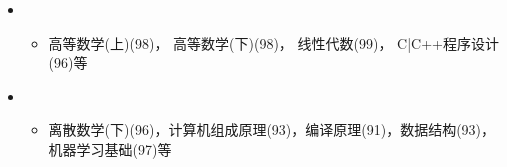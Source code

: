   \begin{itemize}[leftmargin=*]
    \item
      {\small
      \begin{itemize}
        \item{高等数学(上)(98)， 高等数学(下)(98)， 线性代数(99)， C|C++程序设计(96)等}
      \end{itemize}
      }
    \item
      {\small
      \begin{itemize}
        \item{离散数学(下)(96)，计算机组成原理(93)，编译原理(91)，数据结构(93)，机器学习基础(97)等}
      \end{itemize}
      }
  \end{itemize}